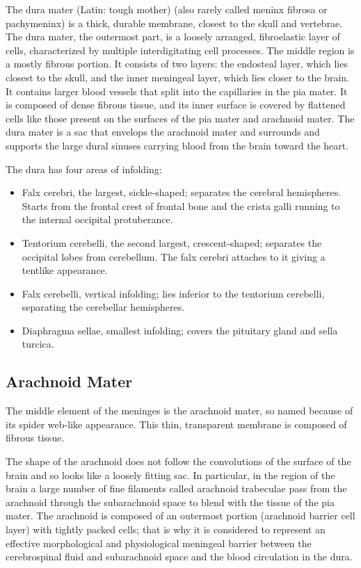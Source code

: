 The dura mater (Latin: tough mother) (also rarely called meninx fibrosa or pachymeninx) is a thick, durable membrane, closest to the skull and vertebrae. The dura mater, the outermost part, is a loosely arranged, fibroelastic layer of cells, characterized by multiple interdigitating cell processes. The middle region is a mostly fibrous portion. It consists of two layers: the endosteal layer, which lies closest to the skull, and the inner meningeal layer, which lies closer to the brain. It contains larger blood vessels that split into the capillaries in the pia mater. It is composed of dense fibrous tissue, and its inner surface is covered by flattened cells like those present on the surfaces of the pia mater and arachnoid mater. The dura mater is a sac that envelops the arachnoid mater and surrounds and supports the large dural sinuses carrying blood from the brain toward the heart.

The dura has four areas of infolding:

\begin{itemize}
\tightlist
\item
  Falx cerebri, the largest, sickle-shaped; separates the cerebral hemispheres. Starts from the frontal crest of frontal bone and the crista galli running to the internal occipital protuberance.
\item
  Tentorium cerebelli, the second largest, crescent-shaped; separates the occipital lobes from cerebellum. The falx cerebri attaches to it giving a tentlike appearance.
\item
  Falx cerebelli, vertical infolding; lies inferior to the tentorium cerebelli, separating the cerebellar hemispheres.
\item
  Diaphragma sellae, smallest infolding; covers the pituitary gland and sella turcica.
\end{itemize}

\hypertarget{arachnoid-mater}{%
\subsection{Arachnoid Mater}\label{arachnoid-mater}}

The middle element of the meninges is the arachnoid mater, so named because of its spider web-like appearance. This thin, transparent membrane is composed of fibrous tissue.

The shape of the arachnoid does not follow the convolutions of the surface of the brain and so looks like a loosely fitting sac. In particular, in the region of the brain a large number of fine filaments called arachnoid trabeculae pass from the arachnoid through the subarachnoid space to blend with the tissue of the pia mater. The arachnoid is composed of an outermost portion (arachnoid barrier cell layer) with tightly packed cells; that is why it is considered to represent an effective morphological and physiological meningeal barrier between the cerebrospinal fluid and subarachnoid space and the blood circulation in the dura.

